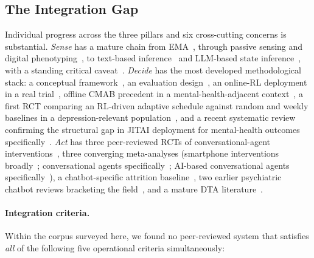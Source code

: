 \documentclass[11pt,a4paper]{article}
\begin{document}
\subsection{The Integration Gap}\label{sec:gap}

Individual progress across the three pillars and six cross-cutting
concerns is substantial. \emph{Sense} has a mature chain from
EMA~\cite{Trull2009ESMEMA,Versluis2016EMI}, through passive
sensing and digital
phenotyping~\cite{Cornet2018PassiveSensing,Sequeira2021PassiveSensing,Insel2018DigitalPhenotyping,Wang2014StudentLife,Wang2020COVIDStudentLife},
to text-based inference~\cite{Boettcher2021RedditMHReview,Walker2024InstagramSuicideLIWC}
and LLM-based state
inference~\cite{Xu2024MentalLLM,Stade2024LLMOppRisks,Guo2024LLMMHReview,Hua2025LLMScopingReview},
with a standing critical
caveat~\cite{BirkSamuel2020DigitalPhenotypingCritique}.
\emph{Decide} has the most developed methodological stack: a
conceptual framework~\cite{NahumShani2018JITAI}, an evaluation
design~\cite{Klasnja2015MRT,Liao2016MRTSampleSize,Luers2018StandardizedEffect,Seewald2019MRTData},
an online-RL deployment in a real
trial~\cite{Liao2020PersonalizedHeartSteps,Klasnja2018HeartStepsMRT},
offline CMAB precedent in a mental-health-adjacent
context~\cite{Ameko2020CMABEmotion}, a first RCT comparing an
RL-driven adaptive schedule against random and weekly baselines in
a depression-relevant population~\cite{Aguilera2024DIAMANTERL},
and a recent systematic review confirming the structural gap in
JITAI deployment for mental-health outcomes
specifically~\cite{NahumShani2025JITAIMHReview}. \emph{Act} has
three peer-reviewed RCTs of conversational-agent
interventions~\cite{Fitzpatrick2017Woebot,Inkster2018Wysa,Heinz2025TherabotRCT},
three converging meta-analyses (smartphone interventions
broadly~\cite{Linardon2019Meta}; conversational agents
specifically~\cite{He2023CASRMeta}; AI-based conversational agents
specifically~\cite{Li2023AICAMeta}), a chatbot-specific attrition
baseline~\cite{Jabir2024AttritionMeta}, two earlier psychiatric
chatbot reviews bracketing the
field~\cite{Vaidyam2019ChatbotsReview,Vaidyam2021ChatbotLandscape},
and a mature DTA
literature~\cite{Henson2019DTA,Lederman2021DTASpecialIssue,MalouinLachance2025DTAReview}.

\paragraph{Integration criteria.}
Within the corpus surveyed here, we found no peer-reviewed system
that satisfies \emph{all} of the following five operational
criteria simultaneously:
\end{document}
